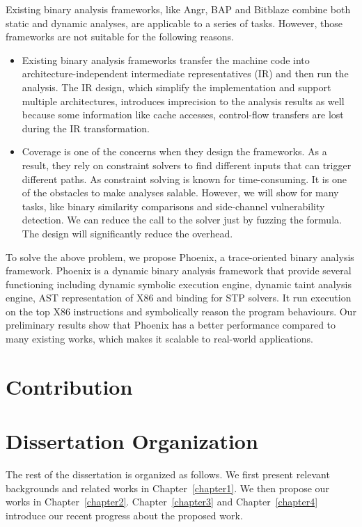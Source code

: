 Existing binary analysis frameworks, like Angr, BAP and Bitblaze combine both static
and dynamic analyses, are applicable to a series of tasks. However, those frameworks
are not suitable for the following reasons. 
\begin{itemize}
    \item Existing binary analysis frameworks transfer the machine code into
    architecture-independent intermediate representatives (IR) and then run the
    analysis. The IR design, which simplify the implementation and support multiple
    architectures, introduces imprecision to the analysis results as well because some
    information like cache accesses, control-flow transfers are lost during the IR
    transformation.
    \item Coverage is one of the concerns when they design the frameworks. 
    As a result, they rely on constraint solvers to find different inputs that can
    trigger different paths. As constraint solving is known for time-consuming. It is
    one of the obstacles to make analyses salable.
    However, we will show for many tasks, like binary similarity comparisons and side-channel vulnerability detection. We can
    reduce the call to the solver just by fuzzing the formula. The design will
    significantly reduce the overhead.
\end{itemize}
To solve the above problem, we propose Phoenix, a trace-oriented binary analysis
framework. Phoenix is a dynamic binary analysis framework that provide several 
functioning including dynamic symbolic execution engine, dynamic taint analysis
engine, AST representation of X86 and binding for STP solvers. It run 
execution on the top X86 instructions and symbolically reason the program behaviours.
Our preliminary results show that Phoenix has a better performance compared to 
many existing works, which makes it scalable to real-world applications.


\section{Contribution}


\section{Dissertation Organization}
The rest of the dissertation is organized as follows. We first present relevant backgrounds and related works in Chapter~\ref{chapter1}. We then propose our works in
Chapter~\ref{chapter2}. Chapter~\ref{chapter3} and Chapter~\ref{chapter4} introduce
our recent progress about the proposed work. 
